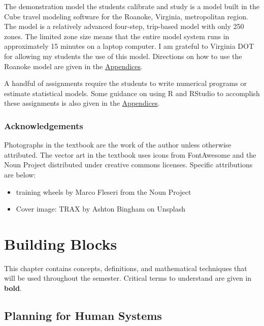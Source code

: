 \documentclass[
]{book}
\providecommand{\tightlist}{%
  \setlength{\itemsep}{0pt}\setlength{\parskip}{0pt}}
\begin{document}
The demonstration model the students calibrate and study is a model built in the
Cube travel modeling software for the Roanoke, Virginia, metropolitan region.
The model is a relatively advanced four-step, trip-based model with only 250
zones. The limited zone size means that the entire model system runs in
approximately 15 minutes on a laptop computer. I am grateful to Virginia DOT for
allowing my students the use of this model. Directions on how to use the Roanoke
model are given in the \protect\hyperlink{app-demomodel}{Appendices}.

A handful of assignments require the students to write numerical programs or
estimate statistical models. Some guidance on using R and RStudio to accomplish
these assignments is also given in the \protect\hyperlink{app-rstudio}{Appendices}.

\hypertarget{acknowledgements}{%
\subsection*{Acknowledgements}\label{acknowledgements}}

Photographs in the textbook are the work of the author unless otherwise attributed.
The vector art in the textbook uses icons from FontAwesome and the Noun Project
distributed under creative commons licenses. Specific attributions are below:

\begin{itemize}
\tightlist
\item
  training wheels by Marco Fleseri from the Noun Project
\item
  Cover image: TRAX by Ashton Bingham on Unsplash
\end{itemize}

\hypertarget{chap-blocks}{%
\chapter{Building Blocks}\label{chap-blocks}}

This chapter contains concepts, definitions, and mathematical techniques that will
be used throughout the semester. Critical terms to understand are given in \textbf{bold}.

\hypertarget{planning-for-human-systems}{%
\section{Planning for Human Systems}\label{planning-for-human-systems}}
\end{document}
